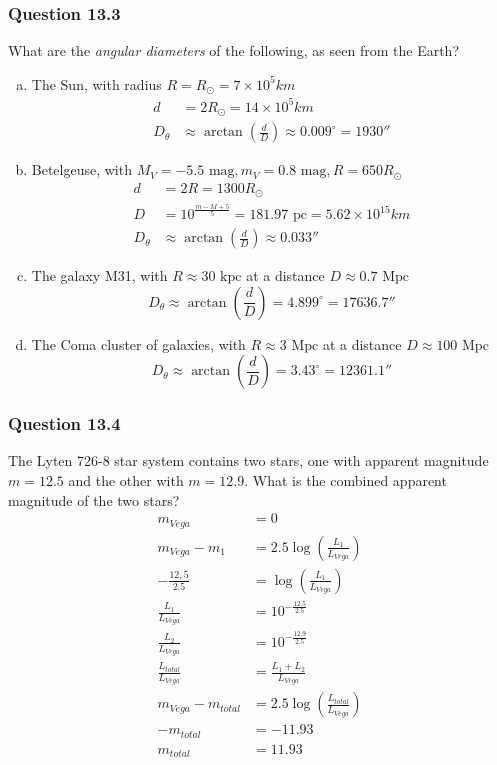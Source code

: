 \documentclass{math}
\begin{document}
\subsubsection*{Question 13.3}
What are the \textit{angular diameters} of the following, as seen from the
Earth?
\begin{enumerate}[(a)]
  \item The Sun, with radius \( R = R_{\odot} = 7\times10^5km \)
  \begin{align*}
    d &= 2R_{\odot} = 14\times10^5km \\
    D_{\theta} &\approx \arctan(\frac{d}{D}) \approx 0.009^{\circ} = 1930''
  \end{align*}
  \item Betelgeuse, with \( M_{V} = -5.5\text{ mag}, m_{V} = 0.8\text{ mag},
    R = 650R_{\odot} \)
  \begin{align*}
    d &= 2R = 1300R_{\odot} \\
    D &= 10^{\frac{m-M+5}{5}} = 181.97\text{ pc} = 5.62\times10^{15}km \\
    D_{\theta} &\approx \arctan(\frac{d}{D}) \approx 0.033''
  \end{align*}
  \item The galaxy M31, with \( R \approx 30\text{ kpc} \) at a distance
    \( D \approx 0.7\text{ Mpc} \)
  \[ D_{\theta} \approx \arctan(\frac{d}{D}) = 4.899^{\circ} = 17636.7'' \]
  \item The Coma cluster of galaxies, with \( R \approx 3\text{ Mpc} \) at a
    distance \( D \approx 100\text{ Mpc} \)
  \[ D_{\theta} \approx \arctan(\frac{d}{D}) = 3.43^{\circ} = 12361.1'' \]
\end{enumerate}

\subsubsection*{Question 13.4}
The Lyten 726-8 star system contains two stars, one with apparent magnitude
\( m = 12.5 \) and the other with \( m = 12.9 \). What is the combined
apparent magnitude of the two stars?
\begin{align*}
  m_{Vega} &= 0 \\
  m_{Vega}-m_1 &= 2.5\log(\frac{L_1}{L_{Vega}}) \\
  -\frac{12,5}{2.5} &= \log(\frac{L_1}{L_{Vega}}) \\
  \frac{L_1}{L_{Vega}} &= 10^{-\frac{12.5}{2.5}} \\
  \frac{L_2}{L_{Vega}} &= 10^{-\frac{12.9}{2.5}} \\
  \frac{L_{total}}{L_{Vega}} &= \frac{L_1+L_2}{L_{Vega}} \\
  m_{Vega}-m_{total} &= 2.5\log(\frac{L_{total}}{L_{Vega}}) \\
  -m_{total} &= -11.93 \\
  m_{total} &= 11.93
\end{align*}
\end{document}
